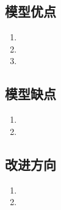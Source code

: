 \documentclass[withoutpreface,bwprint]{cumcmthesis} %
\begin{document}
\subsection{模型优点}
\begin{enumerate}
    \item 
    \item 
    \item 
\end{enumerate}

\subsection{模型缺点}
\begin{enumerate}
    \item 
    \item 
\end{enumerate}

\subsection{改进方向}
\begin{enumerate}
    \item 
    \item 
\end{enumerate}


\end{document}
